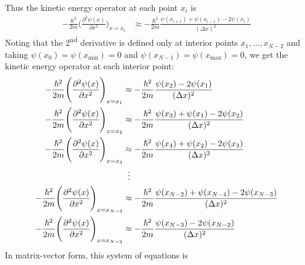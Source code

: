 Thus the kinetic energy operator at each point $x_i$ is
\begin{align*}
    -\frac{\hbar^2}{2m}\Bigg(\frac{\partial^2 \psi(x)}{\partial x^2}\Bigg)_{x=x_i} &\approx -\frac{\hbar^2}{2m}\frac{\psi(x_{i+1}) + \psi(x_{i-1}) - 2\psi(x_{i})}{(\Delta x)^2}
\end{align*}
%
Noting that the 2\textsuperscript{nd} derivative is defined only at interior points $x_1,\dots,x_{N-2}$ and taking $\psi(x_0) = \psi(x_\text{min}) = 0$ and $\psi(x_{N-1}) = \psi(x_\text{max}) = 0$, we get the kinetic energy operator at each interior point:
\begin{align*}
    -\frac{\hbar^2}{2m}\Bigg(\frac{\partial^2 \psi(x)}{\partial x^2}\Bigg)_{x=x_1} &\approx -\frac{\hbar^2}{2m}\frac{\psi(x_2) - 2\psi(x_1)}{(\Delta x)^2} \\
    -\frac{\hbar^2}{2m}\Bigg(\frac{\partial^2 \psi(x)}{\partial x^2}\Bigg)_{x=x_2} &\approx -\frac{\hbar^2}{2m}\frac{\psi(x_{3}) + \psi(x_1) - 2\psi(x_2)}{(\Delta x)^2} \\
    -\frac{\hbar^2}{2m}\Bigg(\frac{\partial^2 \psi(x)}{\partial x^2}\Bigg)_{x=x_3} &\approx -\frac{\hbar^2}{2m}\frac{\psi(x_4) + \psi(x_2) - 2\psi(x_3)}{(\Delta x)^2} \\
    &\hspace{2mm}\vdots \\
    -\frac{\hbar^2}{2m}\Bigg(\frac{\partial^2 \psi(x)}{\partial x^2}\Bigg)_{x=x_{N-3}} &\approx -\frac{\hbar^2}{2m}\frac{\psi(x_{N-2}) + \psi(x_{N-4}) - 2\psi(x_{N-3})}{(\Delta x)^2} \\
    -\frac{\hbar^2}{2m}\Bigg(\frac{\partial^2 \psi(x)}{\partial x^2}\Bigg)_{x=x_{N-2}} &\approx -\frac{\hbar^2}{2m}\frac{\psi(x_{N-3}) - 2\psi(x_{N-2})}{(\Delta x)^2}
\end{align*}
%
In matrix-vector form, this system of equations is
